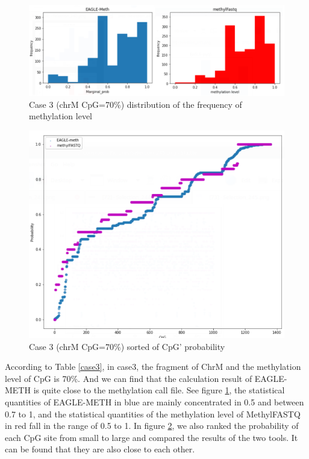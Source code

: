\documentclass{PHlab-thesis}
\begin{document}
\begin{figure}[h]
  \centering
  \includegraphics[scale=0.8]{figures/CHRM_70.PNG}
  \caption{Case 3 (chrM CpG=70\%) distribution of the frequency of methylation level}
  \label{fig:case_3_1} 
\end{figure}
\begin{figure}[h]
  \centering
  \includegraphics[scale=0.8]{figures/CHRM_70_2.PNG}
  \caption{Case 3 (chrM CpG=70\%) sorted of CpG' probability}
  \label{fig:case_3_2} 
\end{figure}

\par According to Table \ref{case3}, in case3, the fragment of ChrM and the methylation level of CpG is 70\%. And we can find that the calculation result of EAGLE-METH is quite close to the methylation call file. See figure \ref{fig:case_3_1}, the statistical quantities of EAGLE-METH in blue are mainly concentrated in 0.5 and between 0.7 to 1, and the statistical quantities of the methylation level of MethylFASTQ in red fall in the range of 0.5 to 1. In figure \ref{fig:case_3_2}, we also ranked the probability of each CpG site from small to large and compared the results of the two tools.  It can be found that they are also close to each other.
\end{document}
